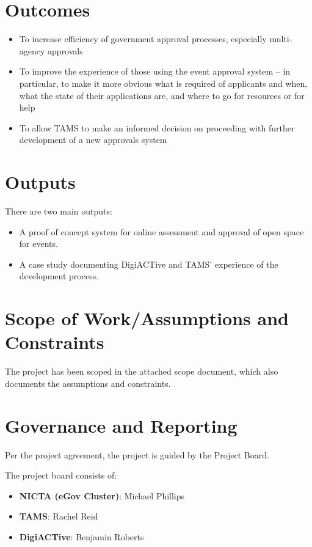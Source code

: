 \documentclass[12pt,a4paper,twosided]{article}
\begin{document}
\section{Outcomes}

\begin{itemize}
\itemsep1pt\parskip0pt
\item
  To increase efficiency of government approval processes, especially
  multi-agency approvals
\item
  To improve the experience of those using the event approval system --
  in particular, to make it more obvious what is required of applicants
  and when, what the state of their applications are, and where to go
  for resources or for help
\item
  To allow TAMS to make an informed decision on proceeding with further
  development of a new approvals system
\end{itemize}

\section{Outputs}

There are two main outputs:

\begin{itemize}
\itemsep1pt\parskip0pt
\item
  A proof of concept system for online assessment and approval of open
  space for events.
\item
  A case study documenting DigiACTive and TAMS' experience of the
  development process.
\end{itemize}

\section{Scope of Work/Assumptions and Constraints}

The project has been scoped in the attached scope document, which also
documents the assumptions and constraints.

\section{Governance and Reporting}

Per the project agreement, the project is guided by the Project Board.

The project board consists of:

\begin{itemize}
\itemsep1pt\parskip0pt
\item
  \textbf{NICTA (eGov Cluster)}: Michael Phillips
\item
  \textbf{TAMS}: Rachel Reid
\item
  \textbf{DigiACTive}: Benjamin Roberts
\end{itemize}
\end{document}
